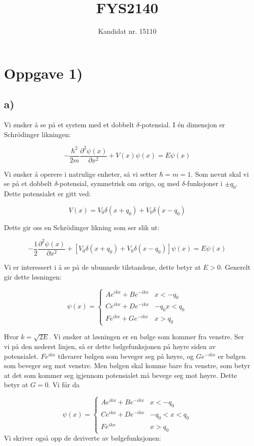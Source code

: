 \documentclass[a4paper,norsk, 10pt]{article}
\title{FYS2140}
\author{Kandidat nr. 15110}
\numberwithin{equation}{section}
\begin{document}
\maketitle

\section{Oppgave 1)}
\subsection*{a)}
Vi ønsker å se på et system med et dobbelt $\delta$-potensial. I én dimensjon er Schrödinger likningen:

$$
-\frac{\hbar^2}{2m}\frac{\partial^2 \psi(x)}{\partial x^2} + V(x)\psi(x) = E\psi(x)
$$

Vi ønsker å operere i natrulige enheter, så vi setter $\hbar = m = 1$. Som nevnt skal vi se på et dobbelt $\delta$-potensial, symmetrisk om origo, og med $\delta$-funksjoner i $\pm q_0$. Dette potensialet er gitt ved:

$$
V(x) = V_0\delta(x+q_0) + V_0\delta(x-q_0)
$$

Dette gir oss en Schrödinger likning som ser slik ut:

\begin{equation}
-\frac{1}{2}\frac{\partial^2 \psi(x)}{\partial x^2} + \left[V_0\delta(x+q_0) + V_0\delta(x-q_0)\right]\psi(x) = E\psi(x)
\label{eq:deltaSchr}
\end{equation}

Vi er interessert i å se på de ubunnede tilstandene, dette betyr at $E>0$. Generelt gir dette løsningen:

$$
\psi(x) = 
\begin{cases}
Ae^{ikx} + Be^{-ikx} & x< -q_0 \\
Ce^{ikx} + De^{-ikx} & -q_0x< q_0 \\
Fe^{ikx} + Ge^{-ikx} & x>q_0 
\end{cases}
$$

Hvor $k = \sqrt{2E}$. Vi ønsker at løsningen er en bølge som kommer fra venstre. Ser vi på den nederst linjen, så er dette bølgefunksjonen på høyre siden av potensialet. $Fe^{ikx}$ tilsvarer bølgen som beveger seg på høyre, og $Ge^{-ikx}$ er bølgen som beveger seg mot venstre. Men bølgen skal komme bare fra venstre, som betyr at det som kommer seg igjennom potensialet må bevege seg mot høyre. Dette betyr at $G = 0$. Vi får da

\begin{equation}
\psi(x) = 
\begin{cases}
Ae^{ikx} + Be^{-ikx} & x< -q_0 \\
Ce^{ikx} + De^{-ikx} & -q_0 < x< q_0 \\
Fe^{ikx} & x>q_0 
\end{cases}
\label{eq:psi}
\end{equation}
\newpage
Vi skriver også opp de deriverte av bølgefunksjonen:
\end{document}
